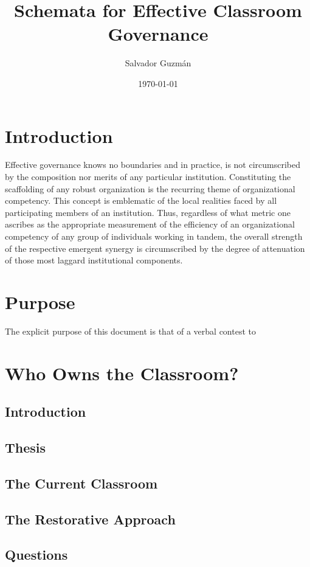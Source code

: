 \documentclass[12pt]{article}
\author{Salvador Guzm\'{a}n}
\date{\today}
\title{Schemata for Effective Classroom Governance}
\begin{document}
	\maketitle
	\pagebreak
	\tableofcontents
	\pagebreak
	
	\section{Introduction}
	Effective governance knows no boundaries and in practice, is not circumscribed by the composition nor merits of any particular institution. Constituting the scaffolding of any robust organization is the recurring theme of organizational competency. This concept is emblematic of the local realities faced by all participating members of an institution. Thus, regardless of what metric one ascribes as the appropriate measurement of the efficiency of an organizational competency of any group of individuals working in tandem, the overall strength of the respective emergent synergy is circumscribed by the degree of attenuation of those most laggard institutional components.
	
	\section{Purpose}
	The explicit purpose of this document is that of a verbal contest to 

	\section{Who Owns the Classroom?}
	\subsection{Introduction}
	\subsection{Thesis}
	\subsection{The Current Classroom}
	\subsection{The Restorative Approach}
	\subsection{Questions}
\end{document}
